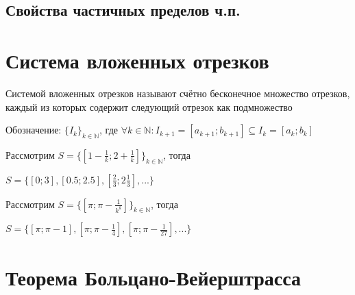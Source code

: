 \subsection{Свойства частичных пределов ч.п.}


\section{Система вложенных отрезков}

{
    Системой вложенных отрезков называют счётно бесконечное множество отрезков, каждый из которых содержит
    следующий отрезок как подмножество

    Обозначение: $ \{ I_k \}_{k \in \mathbb{N}} $, где $ \forall k \in \mathbb{N}: I_{k+1} = [a_{k + 1}; b_{k + 1}] \subseteq I_{k} = [a_k; b_k] $
}

\mcex{}
{
    Рассмотрим $ S = \{ [1 - \frac{1}{k}; 2 + \frac{1}{k}] \}_{k \in \mathbb{N}} $, тогда

    $ S = \{ [0; 3], [0.5; 2.5], [\frac{2}{3}; 2\frac{1}{3}], ... \} $

    Рассмотрим $ S = \{ [\pi; \pi - \frac{1}{k^k}] \}_{k \in \mathbb{N}} $, тогда

    $ S = \{ [\pi; \pi - 1], [\pi; \pi - \frac{1}{4}], [\pi; \pi - \frac{1}{27}], ... \} $
}

\section{Теорема Больцано-Вейерштрасса}

